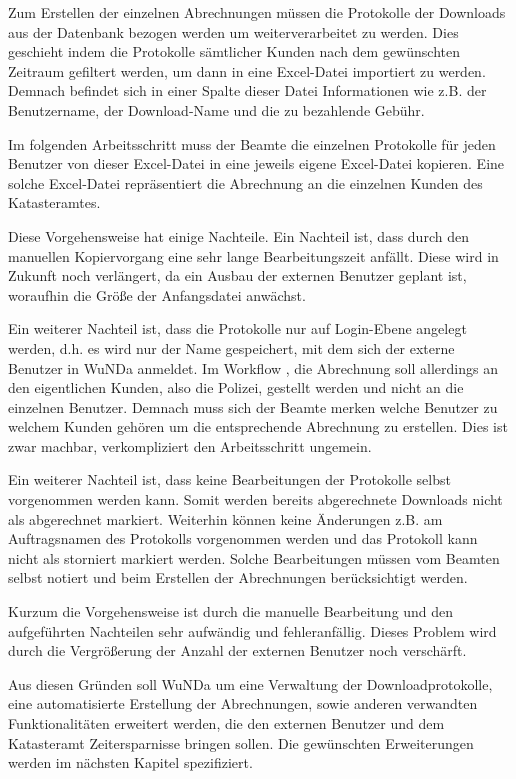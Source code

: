 Zum Erstellen der einzelnen Abrechnungen müssen die Protokolle der Downloads aus der Datenbank bezogen werden um weiterverarbeitet zu werden.
Dies geschieht indem die Protokolle sämtlicher Kunden nach dem gewünschten Zeitraum gefiltert werden, um dann in eine Excel-Datei importiert zu werden.
Demnach befindet sich in einer Spalte dieser Datei Informationen wie z.B. der Benutzername, der Download-Name und die zu bezahlende Gebühr.

Im folgenden Arbeitsschritt muss der Beamte die einzelnen Protokolle für jeden Benutzer von dieser Excel-Datei in eine jeweils eigene Excel-Datei kopieren. Eine solche Excel-Datei repräsentiert die Abrechnung an die einzelnen Kunden des Katasteramtes.

Diese Vorgehensweise hat einige Nachteile. Ein Nachteil ist, dass durch den manuellen Kopiervorgang eine sehr lange Bearbeitungszeit anfällt. Diese wird in Zukunft noch verlängert, da ein Ausbau der externen Benutzer geplant ist, woraufhin die Größe der Anfangsdatei anwächst.

Ein weiterer Nachteil ist, dass die Protokolle nur auf Login-Ebene angelegt werden, d.h. es wird nur der Name gespeichert, mit dem sich der externe Benutzer in \ac{WuNDa} anmeldet.
Im Workflow , die Abrechnung soll allerdings an den eigentlichen Kunden, also die Polizei, gestellt werden und nicht an die einzelnen Benutzer. Demnach muss sich der Beamte merken welche Benutzer zu welchem Kunden gehören um die entsprechende Abrechnung zu erstellen. Dies ist zwar machbar, verkompliziert den Arbeitsschritt ungemein.

Ein weiterer Nachteil ist, dass keine Bearbeitungen der Protokolle selbst vorgenommen werden kann. Somit werden bereits abgerechnete Downloads nicht als abgerechnet markiert. Weiterhin können keine Änderungen z.B. am Auftragsnamen des Protokolls vorgenommen werden und das Protokoll kann nicht als storniert markiert werden. Solche Bearbeitungen müssen vom Beamten selbst notiert und beim Erstellen der Abrechnungen berücksichtigt werden.

Kurzum die Vorgehensweise ist durch die manuelle Bearbeitung und den aufgeführten Nachteilen sehr aufwändig und fehleranfällig. Dieses Problem wird durch die Vergrößerung der Anzahl der externen Benutzer noch verschärft.

Aus diesen Gründen soll \ac{WuNDa} um eine Verwaltung der Downloadprotokolle, eine automatisierte Erstellung der Abrechnungen, sowie anderen verwandten Funktionalitäten erweitert werden, die den externen Benutzer und dem Katasteramt Zeitersparnisse bringen sollen. Die gewünschten Erweiterungen werden im nächsten Kapitel spezifiziert.


